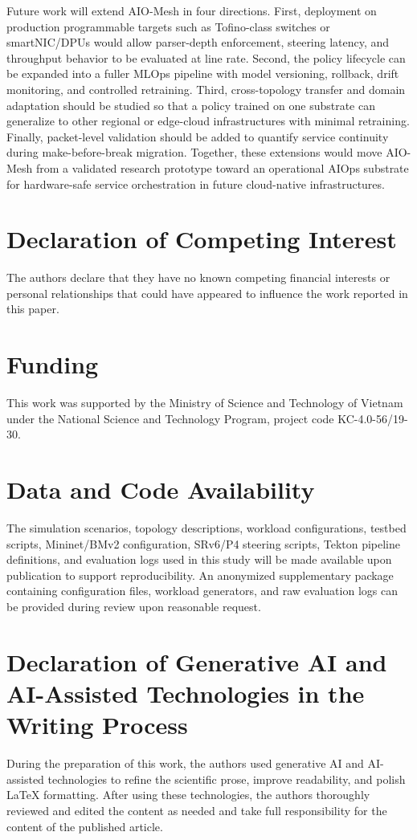 \documentclass[final,5p]{elsarticle}
\begin{document}
Future work will extend AIO-Mesh in four directions. First, deployment on production programmable targets such as Tofino-class switches or smartNIC/DPUs would allow parser-depth enforcement, steering latency, and throughput behavior to be evaluated at line rate. Second, the policy lifecycle can be expanded into a fuller MLOps pipeline with model versioning, rollback, drift monitoring, and controlled retraining. Third, cross-topology transfer and domain adaptation should be studied so that a policy trained on one substrate can generalize to other regional or edge-cloud infrastructures with minimal retraining. Finally, packet-level validation should be added to quantify service continuity during make-before-break migration. Together, these extensions would move AIO-Mesh from a validated research prototype toward an operational AIOps substrate for hardware-safe service orchestration in future cloud-native infrastructures.


\section*{Declaration of Competing Interest}
\noindent The authors declare that they have no known competing financial interests or personal relationships that could have appeared to influence the work reported in this paper.


\section*{Funding}
This work was supported by the Ministry of Science and Technology of Vietnam under the National Science and Technology Program, project code KC-4.0-56/19-30.

\section*{Data and Code Availability}
The simulation scenarios, topology descriptions, workload configurations, testbed scripts, Mininet/BMv2 configuration, SRv6/P4 steering scripts, Tekton pipeline definitions, and evaluation logs used in this study will be made available upon publication to support reproducibility. An anonymized supplementary package containing configuration files, workload generators, and raw evaluation logs can be provided during review upon reasonable request.

\section*{Declaration of Generative AI and AI-Assisted Technologies in the Writing Process}
During the preparation of this work, the authors used generative AI and AI-assisted technologies to refine the scientific prose, improve readability, and polish LaTeX formatting. After using these technologies, the authors thoroughly reviewed and edited the content as needed and take full responsibility for the content of the published article.
\end{document}
